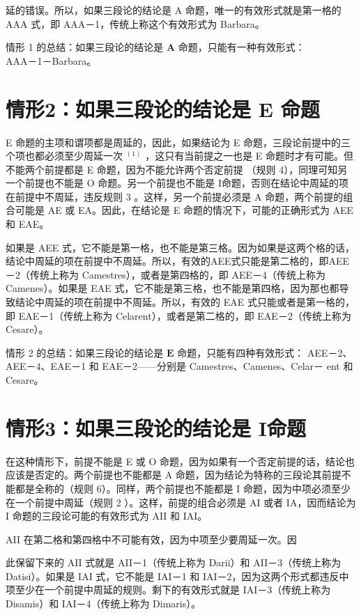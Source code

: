 延的错误。所以，如果三段论的结论是 A 命题，唯一的有效形式就是第一格的 AAA 式，即 AAA－1，传统上称这个有效形式为 Barbara。

情形 1 的总结：如果三段论的结论是 $\mathbf{A}$ 命题，只能有一种有效形式：\\
AAA－1－Barbara。

\section*{情形2：如果三段论的结论是 $\mathbf{E}$ 命题}
E 命题的主项和谓项都是周延的，因此，如果结论为 E 命题，三段论前提中的三个项也都必须至少周延一次 ${ }^{(1)}$ ，这只有当前提之一也是 E 命题时才有可能。但不能两个前提都是 E 命题，因为不能允许两个否定前提 （规则 4），同理可知另一个前提也不能是 O 命题。另一个前提也不能是 I命题，否则在结论中周延的项在前提中不周延，违反规则 3 。这样，另一个前提必须是 A 命题，两个前提的组合可能是 AE 或 EA。因此，在结论是 E 命题的情况下，可能的正确形式为 AEE 和 EAE。

如果是 AEE 式，它不能是第一格，也不能是第三格。因为如果是这两个格的话，结论中周延的项在前提中不周延。所以，有效的AEE式只能是第二格的，即AEE－2（传统上称为 Camestres），或者是第四格的，即 AEE－4（传统上称为 Camenes）。如果是 EAE 式，它不能是第三格，也不能是第四格，因为那也都导致结论中周延的项在前提中不周延。所以，有效的 EAE 式只能或者是第一格的，即 EAE－1（传统上称为 Celarent），或者是第二格的，即 EAE－2（传统上称为 Cesare）。

情形 2 的总结：如果三段论的结论是 $\mathbf{E}$ 命题，只能有四种有效形式： AEE－2、AEE－4、EAE－1 和 EAE－2——分别是 Camestres、Camenes、Celar－ ent 和 Cesare。

\section*{情形3：如果三段论的结论是 I命题}
在这种情形下，前提不能是 E 或 O 命题，因为如果有一个否定前提的话，结论也应该是否定的。两个前提也不能都是 A 命题，因为结论为特称的三段论其前提不能都是全称的（规则 6）。同样，两个前提也不能都是 I 命题，因为中项必须至少在一个前提中周延（规则 2 ）。这样，前提的组合必须是 AI 或者 IA，因而结论为 I 命题的三段论可能的有效形式为 AII 和 IAI。

AII 在第二格和第四格中不可能有效，因为中项至少要周延一次。因

此保留下来的 AII 式就是 AII－1（传统上称为 Darii）和 AII－3（传统上称为 Datisi）。如果是 IAI 式，它不能是 IAI－1 和 IAI－2，因为这两个形式都违反中项至少在一个前提中周延的规则。剩下的有效形式就是 IAI－3（传统上称为 Disamis）和 IAI－4（传统上称为 Dimaris）。

